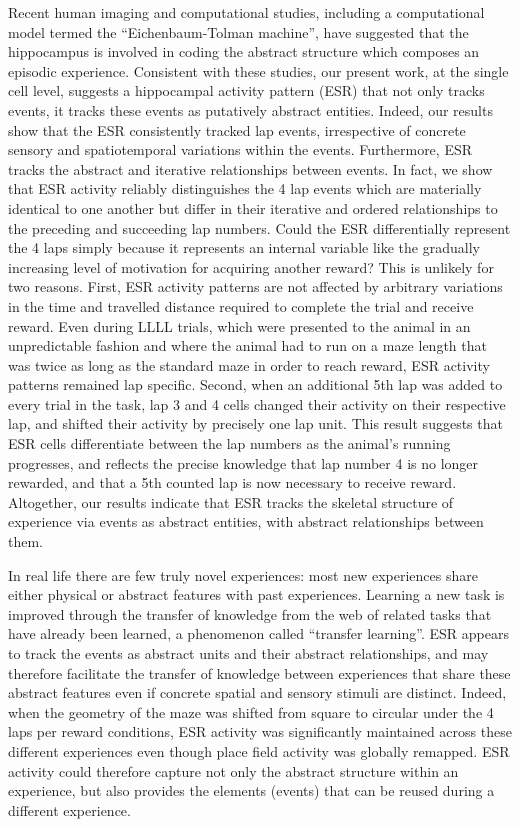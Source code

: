 Recent human imaging and computational studies, including a computational model termed the ``Eichenbaum-Tolman machine'', have suggested that the hippocampus is involved in coding the abstract structure which composes an episodic experience. Consistent with these studies, our present work, at the single cell level, suggests a hippocampal activity pattern (ESR) that not only tracks events, it tracks these events as putatively abstract entities. Indeed, our results show that the ESR consistently tracked lap events, irrespective of concrete sensory and spatiotemporal variations within the events. Furthermore, ESR tracks the abstract and iterative relationships between events. In fact, we show that ESR activity reliably distinguishes the 4 lap events which are materially identical to one another but differ in their iterative and ordered relationships to the preceding and succeeding lap numbers. Could the ESR differentially represent the 4 laps simply because it represents an internal variable like the gradually increasing level of motivation for acquiring another reward? This is unlikely for two reasons. First, ESR activity patterns are not affected by arbitrary variations in the time and travelled distance required to complete the trial and receive reward. Even during LLLL trials, which were presented to the animal in an unpredictable fashion and where the animal had to run on a maze length that was twice as long as the standard maze in order to reach reward, ESR activity patterns remained lap specific. Second, when an additional 5th lap was added to every trial in the task, lap 3 and 4 cells changed their activity on their respective lap, and shifted their activity by precisely one lap unit. This result suggests that ESR cells differentiate between the lap numbers as the animal's running progresses, and reflects the precise knowledge that lap number 4 is no longer rewarded, and that a 5th counted lap is now necessary to receive reward. Altogether, our results indicate that ESR tracks the skeletal structure of experience via events as abstract entities, with abstract relationships between them.

In real life there are few truly novel experiences: most new experiences share either physical or abstract features with past experiences. Learning a new task is improved through the transfer of knowledge from the web of related tasks that have already been learned, a phenomenon called ``transfer learning''. ESR appears to track the events as abstract units and their abstract relationships, and may therefore facilitate the transfer of knowledge between experiences that share these abstract features even if concrete spatial and sensory stimuli are distinct. Indeed, when the geometry of the maze was shifted from square to circular under the 4 laps per reward conditions, ESR activity was significantly maintained across these different experiences even though place field activity was globally remapped. ESR activity could therefore capture not only the abstract structure within an experience, but also provides the elements (events) that can be reused during a different experience.

